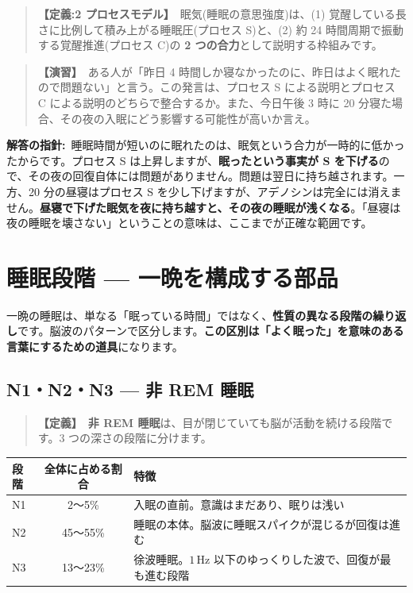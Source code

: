 \documentclass{article}
\begin{document}
\begin{quote}
\textbf{【定義:2 プロセスモデル】}\ 眠気(睡眠の意思強度)は、(1) 覚醒している長さに比例して積み上がる睡眠圧(プロセス S)と、(2) 約 24 時間周期で振動する覚醒推進(プロセス C)の \textbf{2 つの合力}として説明する枠組みです。
\end{quote}

\begin{quote}
\textbf{【演習】}\ ある人が「昨日 4 時間しか寝なかったのに、昨日はよく眠れたので問題ない」と言う。この発言は、プロセス S による説明とプロセス C による説明のどちらで整合するか。また、今日午後 3 時に 20 分寝た場合、その夜の入眠にどう影響する可能性が高いか言え。
\end{quote}

\textbf{解答の指針:}\ 睡眠時間が短いのに眠れたのは、眠気という合力が一時的に低かったからです。プロセス S は上昇しますが、\textbf{眠ったという事実が S を下げる}ので、その夜の回復自体には問題がありません。問題は翌日に持ち越されます。一方、20 分の昼寝はプロセス S を少し下げますが、アデノシンは完全には消えません。\textbf{昼寝で下げた眠気を夜に持ち越すと、その夜の睡眠が浅くなる}。「昼寝は夜の睡眠を壊さない」ということの意味は、ここまでが正確な範囲です。

\section{睡眠段階 — 一晩を構成する部品}

一晩の睡眠は、単なる「眠っている時間」ではなく、\textbf{性質の異なる段階の繰り返し}です。脳波のパターンで区分します。\textbf{この区別は「よく眠った」を意味のある言葉にするための道具}になります。

\subsection{N1・N2・N3 — 非 REM 睡眠}

\begin{quote}
\textbf{【定義】}\ \textbf{非 REM 睡眠}は、目が閉じていても脳が活動を続ける段階です。3 つの深さの段階に分けます。
\end{quote}

\begin{center}
\begin{tabular}{|l|c|l|}
\hline
段階 & 全体に占める割合 & 特徴 \\
\hline
N1 & 2〜5\% & 入眠の直前。意識はまだあり、眠りは浅い \\
N2 & 45〜55\% & 睡眠の本体。脳波に睡眠スパイクが混じるが回復は進む \\
N3 & 13〜23\% & 徐波睡眠。\(1\,\mathrm{Hz}\) 以下のゆっくりした波で、回復が最も進む段階 \\
\hline
\end{tabular}
\end{center}
\end{document}
